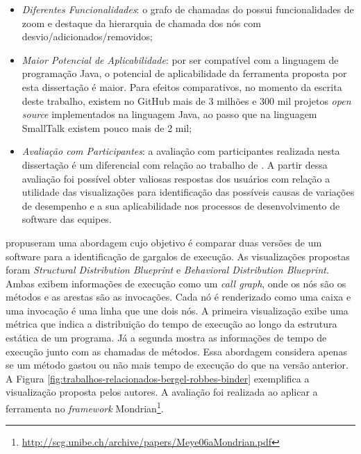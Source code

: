 \begin{itemize}
   \item \textit{Diferentes Funcionalidades}: o grafo de chamadas do {\textit{\toolName}} possui funcionalidades de zoom e destaque da hierarquia de chamada dos nós com desvio/adicionados/removidos;
   \item \textit{Maior Potencial de Aplicabilidade}: por ser compatível com a linguagem de programação Java, o potencial de aplicabilidade da ferramenta proposta por esta dissertação é maior. Para efeitos comparativos, no momento da escrita deste trabalho, existem no GitHub mais de 3 milhões e 300 mil projetos \textit{open source} implementados na linguagem Java, ao passo que na linguagem SmallTalk existem pouco mais de 2 mil;
   \item \textit{Avaliação com Participantes}: a avaliação com participantes realizada nesta dissertação é um diferencial com relação ao trabalho de \citeauthor{SandovalAlcocer2013}. A partir dessa avaliação foi possível obter valiosas respostas dos usuários com relação a utilidade das visualizações para identificação das possíveis causas de variações de desempenho e a sua aplicabilidade nos processos de desenvolvimento de software das equipes.
\end{itemize}


\citeauthor{Bergel} propuseram uma abordagem cujo objetivo é comparar duas versões de um software para a identificação de gargalos de execução. As visualizações propostas foram \textit{Structural Distribution Blueprint} e \textit{Behavioral Distribution Blueprint}. Ambas exibem informações de execução como um \textit{call graph}, onde os nós são os métodos e as arestas são as invocações. Cada nó é renderizado como uma caixa e uma invocação é uma linha que une dois nós. A primeira visualização exibe uma métrica que indica a distribuição do tempo de execução ao longo da estrutura estática de um programa. Já a segunda mostra as informações de tempo de execução junto com as chamadas de métodos. Essa abordagem considera apenas se um método gastou ou não mais tempo de execução do que na versão anterior. A Figura \ref{fig:trabalhos-relacionados-bergel-robbes-binder} exemplifica a visualização proposta pelos autores. A avaliação foi realizada ao aplicar a ferramenta no \textit{framework} Mondrian\footnote{\href{http://scg.unibe.ch/archive/papers/Meye06aMondrian.pdf}{http://scg.unibe.ch/archive/papers/Meye06aMondrian.pdf}}.

